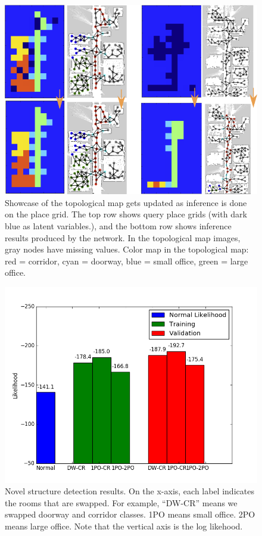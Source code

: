\documentclass[10pt, titlepage]{article}
\theoremstyle{definition}
\begin{document}
\begin{figure}[!htb]
    \centering
    \captionsetup{width=.8\linewidth}
    \includegraphics[scale=0.7]{images/placegri_graph_illustration.png}
    \caption{Showcase of the topological map gets updated as inference is done on the place grid. The top row shows query place grids (with dark blue as latent variables.), and the bottom row shows inference results produced by the network. In the topological map images, gray nodes have missing values. Color map in the topological map: red = corridor, cyan = doorway, blue = small office, green = large office.}
    \label{fig:pg_graph}
\end{figure}


\begin{figure}[!htb]
    \centering
    \captionsetup{width=.8\linewidth}
    \includegraphics[scale=0.4]{images/novelty.png}
    \caption{Novel structure detection results. On the x-axis, each label indicates the rooms that are swapped. For example, ``DW-CR'' means we swapped doorway and corridor classes. 1PO means small office. 2PO means large office. Note that the vertical axis is the log likehood.}
    \label{fig:novelty}
\end{figure}
\end{document}
